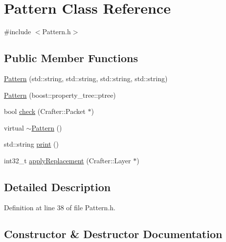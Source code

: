\hypertarget{class_pattern}{}\section{Pattern Class Reference}
\label{class_pattern}


{\ttfamily \#include $<$Pattern.\+h$>$}

\subsection*{Public Member Functions}
\begin{DoxyCompactItemize}
\item 
\hyperlink{class_pattern_a7d6f58ea6e73e4b79a7f722a59ce64af}{Pattern} (std\+::string, std\+::string, std\+::string, std\+::string)
\item 
\hyperlink{class_pattern_ae0acce75099bf7776feab7d86f34e21f}{Pattern} (boost\+::property\+\_\+tree\+::ptree)
\item 
bool \hyperlink{class_pattern_a9b89524b05dc9430bd479928d4c08a4d}{check} (Crafter\+::\+Packet $\ast$)
\item 
virtual \hyperlink{class_pattern_a6e8b9388bbd39934e9f9534b974d7498}{$\sim$\+Pattern} ()
\item 
std\+::string \hyperlink{class_pattern_af1563aeb5e7bb378e810267da623906e}{print} ()
\item 
int32\+\_\+t \hyperlink{class_pattern_ac18d670fe54682f7fc6e3da229988ca0}{apply\+Replacement} (Crafter\+::\+Layer $\ast$)
\end{DoxyCompactItemize}


\subsection{Detailed Description}


Definition at line 38 of file Pattern.\+h.



\subsection{Constructor \& Destructor Documentation}
